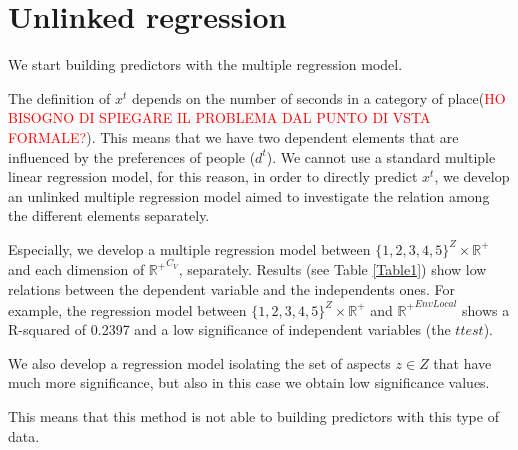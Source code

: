 \documentclass[a4paper]{article}
\begin{document}
\section{Unlinked regression}
We start building predictors with the multiple regression model.

The definition of $x^t$ depends on the number of seconds in a category of place(\textcolor{red}{HO BISOGNO DI SPIEGARE IL PROBLEMA DAL PUNTO DI VSTA FORMALE?}).  This means that we have two dependent elements that are influenced  by the preferences of people ($d^t$). We cannot use a standard multiple linear regression model, for this reason, in order to directly predict $x^t$, we develop an unlinked  multiple regression model aimed to investigate the relation among the different elements separately.

Especially, we develop a multiple regression model between ${\{1, 2, 3, 4, 5\}}^Z \times {\mathbb{R}^+}$ and each dimension of ${\mathbb{R}^+}^{C_V}$, separately.
Results (see Table \ref{Table1}) show low relations between the dependent variable and the independents ones. For example, the regression model between  ${\{1, 2, 3, 4, 5\}}^Z \times {\mathbb{R}^+}$ and ${\mathbb{R}^+}^{EnvLocal}$ shows a R-squared of 0.2397 and a low significance of  independent variables (the $t test$).

We also develop a regression model isolating the set of aspects $z \in Z$ that have much more significance, but also in this case we obtain low significance values.

This means that this method is not able to building predictors with this type of data.
\end{document}
